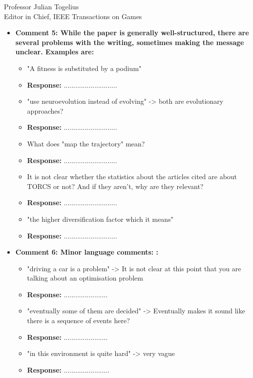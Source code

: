 \documentclass[10pt]{letter} %
\begin{document}
\begin{letter}{Professor Julian Togelius \\ Editor in Chief, IEEE Transactions on Games}
\begin{enumerate}
\begin{itemize}
		\item {\bf 	  Comment 5: While the paper is generally well-structured, there are several problems with the writing, sometimes making the message unclear. Examples are:}
			\begin{itemize}
			\item "A fitness is substituted by a podium"\\
					\item {\bf Response:} ............................
			\item "use neuroevolution instead of evolving" -> both are evolutionary approaches?\\
					\item {\bf Response:} ............................
			\item What does "map the trajectory" mean?\\
					\item {\bf Response:} ............................
			\item It is not clear whether the statistics about the articles cited are about TORCS or not? And if they aren't, why are they relevant?\\
					\item {\bf Response:} ............................
			\item "the higher diversification factor which it means"\\
					\item {\bf Response:} ............................
			\end{itemize}
	

	\item {\bf   Comment 6: Minor language comments: :} 
				\begin{itemize}
				\item 	"driving a car is a problem" -> It is not clear at this point that you are talking about an optimisation problem\\
				\item {\bf Response:}  .......................
				\item 	"eventually some of them are decided" -> Eventually makes it sound like there is a sequence of events here?\\
				\item {\bf Response:} .......................
	

				\item 	"in this environment is quite hard" -> very vague\\
				\item {\bf Response:} ........................


\end{itemize}
\end{itemize}
\end{enumerate}
\end{letter}
\end{document}
